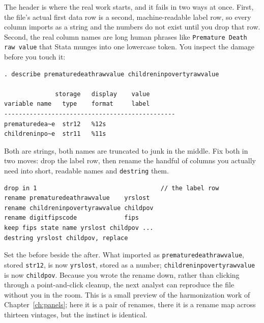 \documentclass[
    a4paper,
    fontsize=10pt,
    twoside=true,
    numbers=noenddot,
]{kaobook}
\begin{document}
The header is where the real work starts, and it fails in two ways at once. First, the file's actual first data row is a second, machine-readable label row, so every column imports as a string and the numbers do not exist until you drop that row. Second, the real column names are long human phrases like \texttt{Premature Death raw value} that Stata munges into one lowercase token. You inspect the damage before you touch it:
\par
{\footnotesize
\begin{verbatim}
. describe prematuredeathrawvalue childreninpovertyrawvalue

              storage   display    value
variable name   type    format     label
-----------------------------------------------
prematuredea~e  str12   %12s
childreninpo~e  str11   %11s
\end{verbatim}
}
Both are strings, both names are truncated to junk in the middle. Fix both in two moves: drop the label row, then rename the handful of columns you actually need into short, readable names and \texttt{destring} them.
\par
{\footnotesize
\begin{verbatim}
drop in 1                                  // the label row
rename prematuredeathrawvalue    yrslost
rename childreninpovertyrawvalue childpov
rename digitfipscode             fips
keep fips state name yrslost childpov ...
destring yrslost childpov, replace
\end{verbatim}
}
Set the before beside the after. What imported as \texttt{premature\allowbreak death\allowbreak raw\allowbreak value}, stored \texttt{str12}, is now \texttt{yrslost}, stored as a number; \texttt{childrenin\allowbreak poverty\allowbreak raw\allowbreak value} is now \texttt{childpov}. Because you wrote the rename down, rather than clicking through a point-and-click cleanup, the next analyst can reproduce the file without you in the room. This is a small preview of the harmonization work of Chapter~\ref{ch:panels}; here it is a pair of renames, there it is a rename map across thirteen vintages, but the instinct is identical.
\end{document}
